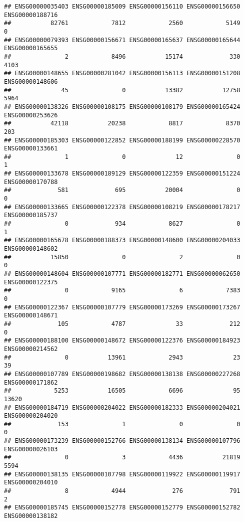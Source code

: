 \documentclass[
]{article}
\begin{document}
\begin{verbatim}
## ENSG00000035403 ENSG00000185009 ENSG00000156110 ENSG00000156650 ENSG00000188716 
##           82761            7812            2560            5149               0 
## ENSG00000079393 ENSG00000156671 ENSG00000165637 ENSG00000165644 ENSG00000165655 
##               2            8496           15174             330            4103 
## ENSG00000148655 ENSG00000281042 ENSG00000156113 ENSG00000151208 ENSG00000148606 
##              45               0           13382           12758            5964 
## ENSG00000138326 ENSG00000108175 ENSG00000108179 ENSG00000165424 ENSG00000253626 
##           42118           20238            8817            8370             203 
## ENSG00000185303 ENSG00000122852 ENSG00000188199 ENSG00000228570 ENSG00000133661 
##               1               0              12               0               1 
## ENSG00000133678 ENSG00000189129 ENSG00000122359 ENSG00000151224 ENSG00000170788 
##             581             695           20004               0               0 
## ENSG00000133665 ENSG00000122378 ENSG00000108219 ENSG00000178217 ENSG00000185737 
##               0             934            8627               0               1 
## ENSG00000165678 ENSG00000188373 ENSG00000148600 ENSG00000204033 ENSG00000148602 
##           15850               0               2               0               0 
## ENSG00000148604 ENSG00000107771 ENSG00000182771 ENSG00000062650 ENSG00000122375 
##               0            9165               6            7383               0 
## ENSG00000122367 ENSG00000107779 ENSG00000173269 ENSG00000173267 ENSG00000148671 
##             105            4787              33             212               0 
## ENSG00000188100 ENSG00000148672 ENSG00000122376 ENSG00000184923 ENSG00000214562 
##               0           13961            2943              23              39 
## ENSG00000107789 ENSG00000198682 ENSG00000138138 ENSG00000227268 ENSG00000171862 
##            5253           16505            6696              95           13620 
## ENSG00000184719 ENSG00000204022 ENSG00000182333 ENSG00000204021 ENSG00000204020 
##             153               1               0               0               0 
## ENSG00000173239 ENSG00000152766 ENSG00000138134 ENSG00000107796 ENSG00000026103 
##               0               3            4436           21819            5594 
## ENSG00000138135 ENSG00000107798 ENSG00000119922 ENSG00000119917 ENSG00000204010 
##               8            4944             276             791               2 
## ENSG00000185745 ENSG00000152778 ENSG00000152779 ENSG00000152782 ENSG00000138182 

\end{verbatim}
\end{document}
